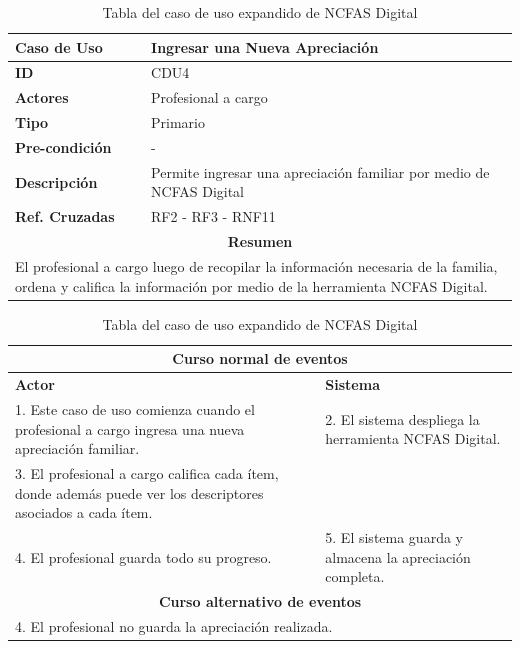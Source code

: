 \begin{table}
\centering
\begin{tabular}{|p{6cm} |p{6cm}|}
	\hline \textbf{Caso de Uso} & Ingresar una Nueva Apreciación \\ 
	\hline \textbf{ID} & CDU4 \\ 
	\hline \textbf{Actores} & Profesional a cargo \\ 
	\hline \textbf{Tipo} & Primario \\ 
	\hline \textbf{Pre-condición} & - \\ 
	\hline \textbf{Descripción} & Permite ingresar una apreciación familiar por medio de NCFAS Digital \\
	\hline \textbf{Ref. Cruzadas} & RF2 - RF3 - RNF11 \\ 
	\hline
	\multicolumn{2}{|c|}{\textbf{Resumen}} \\
	\hline
	\multicolumn{2}{|p{12cm}|}{El profesional a cargo luego de recopilar la información necesaria de la familia, ordena y califica la información por medio de la herramienta NCFAS Digital.} \\
	\hline 
\end{tabular}  
\begin{tabular}{|p{6cm}|p{6cm}|}
	
	\multicolumn{2}{|c|}{\textbf{Curso normal de eventos}} \\
	\hline \textbf{Actor} & \textbf{Sistema} \\ 
	\hline 1. Este caso de uso comienza cuando el profesional a cargo ingresa una nueva apreciación familiar. & 2. El sistema despliega la herramienta NCFAS Digital.  \\ 
	3. El profesional a cargo califica cada ítem, donde además puede ver los descriptores asociados a cada ítem.&  \\
	4. El profesional guarda todo su progreso. & 5. El sistema guarda y almacena la apreciación completa. \\
	\hline
	\multicolumn{2}{|c|}{\textbf{Curso alternativo de eventos}} \\
	\hline
	\multicolumn{2}{|p{12cm}|}{4. El profesional no guarda la apreciación realizada. } \\
	\hline
\end{tabular}
\caption{Tabla del caso de uso expandido de NCFAS Digital}
\label{tabcdu4}
\end{table}

\newpage
\clearpage


